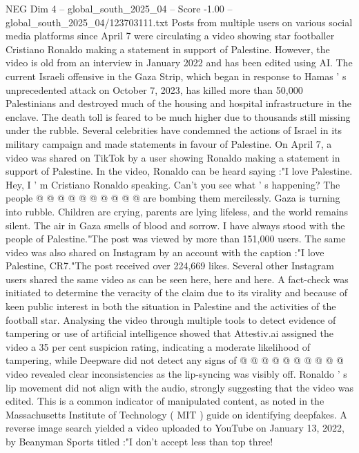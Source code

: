 \begin{textsample}{NEG Dim 4 – global\_south\_2025\_04 – Score -1.00 – global\_south\_2025\_04/123703111.txt}  \label{ex:f4_neg_211}
Posts from multiple users on various social media platforms since April 7 were circulating a video showing star footballer Cristiano Ronaldo making a statement in support of Palestine.
However, the video is old from an interview in January 2022 and has been edited using AI.
The current Israeli offensive in the Gaza Strip, which began in response to Hamas ' s unprecedented attack on October 7, 2023, has killed more than 50,000 Palestinians and destroyed much of the housing and hospital infrastructure in the enclave.
The death toll is feared to be much higher due to thousands still missing under the rubble.
Several celebrities have condemned the actions of Israel in its military campaign and made statements in favour of Palestine.
On April 7, a video was shared on TikTok by a user showing Ronaldo making a statement in support of Palestine.
In the video, Ronaldo can be heard saying :"I love Palestine.
Hey, I ' m Cristiano Ronaldo speaking.
Can't you see what ' s happening?
The people @ @ @ @ @ @ @ @ @ @ are bombing them mercilessly.
Gaza is turning into rubble.
Children are crying, parents are lying lifeless, and the world remains silent.
The air in Gaza smells of blood and sorrow.
I have always stood with the people of Palestine."The post was viewed by more than 151,000 users.
The same video was also shared on Instagram by an account with the caption :"I love Palestine, CR7."The post received over 224,669 likes.
Several other Instagram users shared the same video as can be seen here, here and here.
A fact-check was initiated to determine the veracity of the claim due to its virality and because of keen public interest in both the situation in Palestine and the activities of the football star.
Analysing the video through multiple tools to detect evidence of tampering or use of artificial intelligence showed that Attestiv.ai assigned the video a 35 per cent suspicion rating, indicating a moderate likelihood of tampering, while Deepware did not detect any signs of @ @ @ @ @ @ @ @ @ @ video revealed clear inconsistencies as the lip-syncing was visibly off.
Ronaldo ' s lip movement did not align with the audio, strongly suggesting that the video was edited.
This is a common indicator of manipulated content, as noted in the Massachusetts Institute of Technology ( MIT ) guide on identifying deepfakes.
A reverse image search yielded a video uploaded to YouTube on January 13, 2022, by Beanyman Sports titled :"I don't accept less than top three!

\end{textsample}
